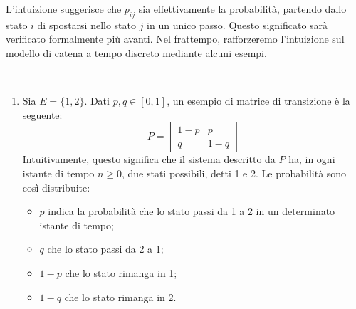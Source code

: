 L'intuizione suggerisce che $p_{ij}$ sia effettivamente la probabilità, partendo dallo stato $i$ di spostarsi nello stato $j$ in un unico passo.
Questo significato sarà verificato formalmente più avanti.
Nel frattempo, rafforzeremo l'intuizione sul modello di catena a tempo discreto mediante alcuni esempi.

\begin{ese}~\\
	\label{catene-triangolari}
	\begin{enumerate}
		\item Sia $E = \{1,2\}$. Dati $p,q \in [0,1]$, un esempio di matrice di transizione è la seguente:
		$$P = \begin{bmatrix} 1-p & p \\ q & 1-q\end{bmatrix}$$
		Intuitivamente, questo significa che il sistema descritto da $P$ ha, in ogni istante di tempo $n\ge 0$, due stati possibili, detti 1 e 2.
		Le probabilità sono così distribuite:
		\begin{itemize}[label=$\ast$]
			\item $p$ indica la probabilità che lo stato passi da 1 a 2 in un determinato istante di tempo;
			\item $q$ che lo stato passi da 2 a 1;
			\item $1-p$ che lo stato rimanga in 1;
			\item $1-q$ che lo stato rimanga in 2.
		\end{itemize}

		\begin{figure}[H]
		  \centering
\end{figure}
\end{enumerate}
\end{ese}
